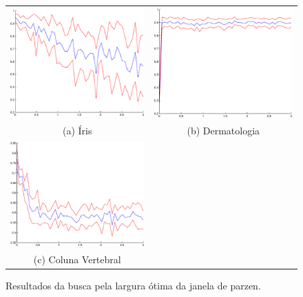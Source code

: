 \documentclass[ 
	article,			%
	11pt,				%
	oneside,			%
	a4paper,			%
	english,			%
	brazil,				%
	]{abntex2}
\begin{document}
\begin{figure}
	\centering
	\begin{tabular}{cc}
	  \includegraphics[width=65mm]{matlab/figura/iris_BAYES_ParzenSearch.eps} &
	  \includegraphics[width=65mm]{matlab/figura/derme_BAYES_ParzenSearch.eps}
	  \\
	(a) Íris & (b) Dermatologia \\[6pt] 
	 \includegraphics[width=65mm]{matlab/figura/vertebra_BAYES_ParzenSearch.eps}  &
	 \\
	(c) Coluna Vertebral &  \\[6pt] 

	\end{tabular}

	\caption{Resultados da busca pela largura ótima da janela de parzen.}
	\label{fig:parzenGraphResults}
\end{figure}
\end{document}

